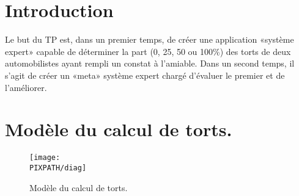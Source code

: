 \section*{Introduction}
Le but du TP est, dans un premier temps,  de créer une application «système expert» capable de
déterminer la part (0, 25, 50 ou 100\%) des torts de deux automobilistes
ayant rempli un constat à l'amiable.
Dans un second temps, il s'agit de créer un «meta» système expert chargé
d'évaluer le premier et de l'améliorer.

\vfill

\section{Modèle du calcul de torts.}
\begin{figure}[!h]
\begin{center}
        \texttt{[image: \\PIXPATH/diag]}
        \caption{Modèle du calcul de torts.}
\end{center}
\end{figure}

